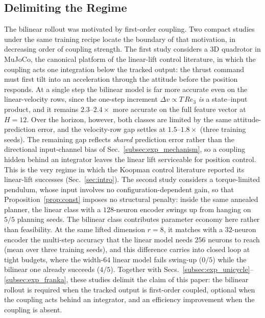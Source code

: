 \documentclass[lettersize,journal]{IEEEtran}
\theoremstyle{remark}
\begin{document}
\subsection{Delimiting the Regime}\label{subsec:exp_regime}

The bilinear rollout was motivated by first-order coupling. Two compact
studies under the same training recipe locate the boundary of that
motivation, in decreasing order of coupling strength.
The first study considers a $3$D quadrotor in MuJoCo, the canonical
platform of the linear-lift control literature, in which the coupling
acts one integration below the tracked output: the thrust command must
first tilt into an acceleration through the attitude before the
position responds. At a single step the bilinear model is far more
accurate even on the linear-velocity rows, since the one-step increment
$\Delta v \propto T\,R e_3$ \emph{is} a state--input product, and it
remains $2.3$--$2.4\times$ more accurate on the full feature vector at
$H = 12$. Over the horizon, however, both classes are limited by the
same attitude-prediction error, and the velocity-row gap settles at
$1.5$--$1.8\times$ (three training seeds). The remaining gap reflects
\emph{shared} prediction error rather than the directional
input-channel bias of Sec.~\ref{subsec:exp_mechanism}, so a coupling
hidden behind an integrator leaves the linear lift serviceable for
position control. This is the very regime in which the Koopman control
literature reported its linear-lift successes (Sec.~\ref{sec:intro}).
The second study considers a torque-limited pendulum, whose input
involves no configuration-dependent gain, so that
Proposition~\ref{prop:const} imposes no structural penalty: inside the
same annealed planner, the linear class with a $128$-neuron encoder
swings up from hanging on $5/5$ planning seeds. The bilinear class
contributes parameter economy here rather than feasibility. At the same
lifted dimension $r = 8$, it matches with a $32$-neuron encoder the
multi-step accuracy that the linear model needs $256$ neurons to reach
(mean over three training seeds), and this difference carries into
closed loop at tight budgets, where the width-$64$ linear model fails
swing-up ($0/5$) while the bilinear one already succeeds ($4/5$).
Together with
Secs.~\ref{subsec:exp_unicycle}--\ref{subsec:exp_franka}, these studies
delimit the claim of this paper: the bilinear rollout is required when
the tracked output is first-order coupled, optional when the coupling
acts behind an integrator, and an efficiency improvement when the
coupling is absent.
\end{document}
